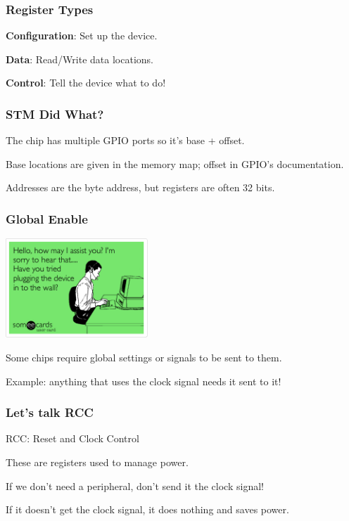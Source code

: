 \begin{frame}
\frametitle{Register Types}

\textbf{Configuration}: Set up the device.

\textbf{Data}: Read/Write data locations.

\textbf{Control}: Tell the device what to do!

\end{frame}


\begin{frame}
\frametitle{STM Did What?}

The chip has multiple GPIO ports so it's base + offset.

Base locations are given in the memory map; offset in GPIO's documentation.

Addresses are the byte address, but registers are often 32 bits.

\end{frame}




\begin{frame}
\frametitle{Global Enable}


\begin{center}
	\includegraphics[width=0.4\textwidth]{images/plugin.png}
\end{center}

Some chips require global settings or signals to be sent to them.

Example: anything that uses the clock signal needs it sent to it!

\end{frame}


\begin{frame}
\frametitle{Let's talk RCC}

\alert{RCC}: Reset and Clock Control

These are registers used to manage power.

If we don't need a peripheral, don't send it the clock signal!

If it doesn't get the clock signal, it does nothing and saves power.


\end{frame}





